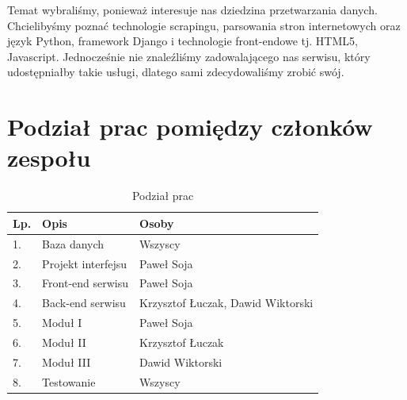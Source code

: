 \documentclass[12pt, titlepage]{article}
\begin{document}
	Temat wybraliśmy, ponieważ interesuje nas dziedzina przetwarzania danych. Chcielibyśmy poznać technologie scrapingu, parsowania stron internetowych oraz język Python, framework Django i technologie front-endowe tj. HTML5, Javascript. Jednocześnie nie znaleźliśmy zadowalającego nas serwisu, który udostępniałby takie usługi, dlatego sami zdecydowaliśmy zrobić swój.
	\section{Podział prac pomiędzy członków zespołu}
	\begin{table}[H]
		\setlength\extrarowheight{5pt}
		\centering
		\caption{Podział prac}
		\label{podzial_prac}
		\begin{tabular}{ | C{2cm} | C{6cm} | C{8cm} | }
			\hline
			\textbf{Lp.} &	\textbf{Opis} &	\textbf{Osoby} \\ \hline
			1.	&	Baza danych			&	Wszyscy \\ \hline
			2.	&	Projekt interfejsu	&	Paweł Soja \\ \hline
			3.	&	Front-end serwisu	&	Paweł Soja \\ \hline
			4.	&	Back-end serwisu	&	Krzysztof Łuczak, Dawid Wiktorski \\ \hline
			5.	&	Moduł I				&	Paweł Soja \\ \hline
			6.	&	Moduł II			&	Krzysztof Łuczak \\ \hline
			7.	&	Moduł III			&	Dawid Wiktorski \\ \hline
			8.	&	Testowanie			&	Wszyscy \\ \hline
		\end{tabular}
	\end{table}
		
\end{document}
